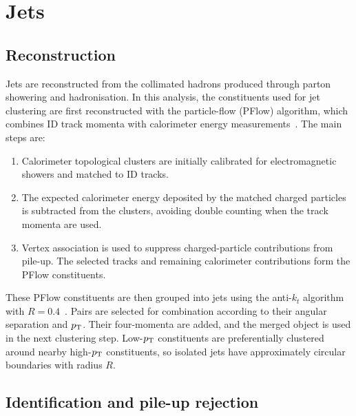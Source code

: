 \section{Jets}
\label{sec:ch6_jets}

\subsection{Reconstruction}

Jets are reconstructed from the collimated hadrons produced through parton showering and hadronisation.
In this analysis, the constituents used for jet clustering are first reconstructed with the particle-flow (PFlow) algorithm, which combines ID track momenta with calorimeter energy measurements~\cite{ATLAS2017ParticleFlow}.
The main steps are:
\begin{enumerate}
    \item Calorimeter topological clusters are initially calibrated for electromagnetic showers and matched to ID tracks.
    \item The expected calorimeter energy deposited by the matched charged particles is subtracted from the clusters, avoiding double counting when the track momenta are used.
    \item Vertex association is used to suppress charged-particle contributions from pile-up. The selected tracks and remaining calorimeter contributions form the PFlow constituents.
\end{enumerate}

These PFlow constituents are then grouped into jets using the anti-$k_t$ algorithm with $R=0.4$~\cite{Cacciari2008AntiKt}.
Pairs are selected for combination according to their angular separation and $p_{\mathrm{T}}$.
Their four-momenta are added, and the merged object is used in the next clustering step.
Low-$p_{\mathrm{T}}$ constituents are preferentially clustered around nearby high-$p_{\mathrm{T}}$ constituents, so isolated jets have approximately circular boundaries with radius $R$.

\subsection{Identification and pile-up rejection}

